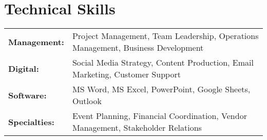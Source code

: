 \documentclass[10pt]{article}
\begin{document}
\section{Technical Skills}
\begin{tabularx}{\textwidth}{@{} l X @{}}
\textbf{Management:} & Project Management, Team Leadership, Operations Management, Business Development \\
\textbf{Digital:} & Social Media Strategy, Content Production, Email Marketing, Customer Support \\
\textbf{Software:} & MS Word, MS Excel, PowerPoint, Google Sheets, Outlook \\
\textbf{Specialties:} & Event Planning, Financial Coordination, Vendor Management, Stakeholder Relations \\
\end{tabularx}

\end{document}
